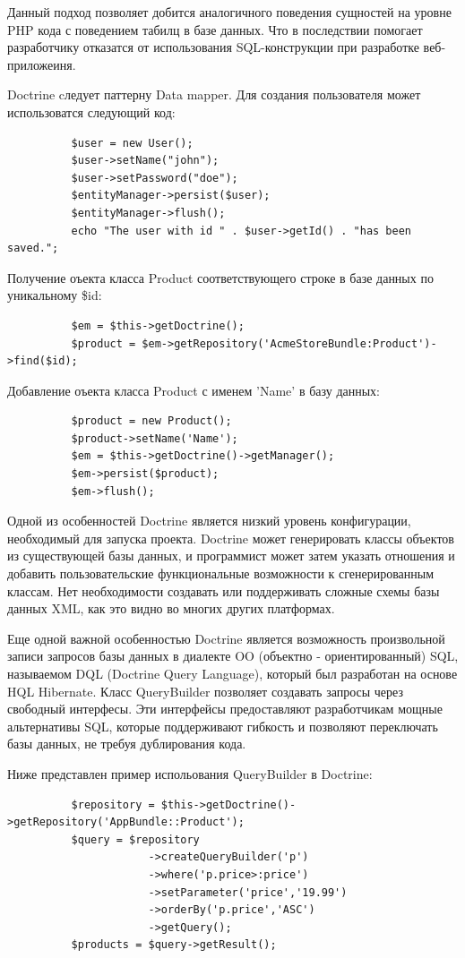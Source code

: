 Данный подход позволяет добится аналогичного поведения сущностей на уровне PHP кода с поведением табилц в базе данных. Что в последствии помогает разработчику отказатся от использования SQL-конструкции при разработке веб-приложеиня. 

Doctrine cледует паттерну Data mapper. Для создания пользователя может использоватся следующий код:

\begin{lstlisting}
          $user = new User();
          $user->setName("john");
          $user->setPassword("doe");
          $entityManager->persist($user);
          $entityManager->flush();
          echo "The user with id " . $user->getId() . "has been saved.";
\end{lstlisting}


Получение оъекта класса Product соответствующего строке в базе данных по уникальному \$id:
\begin{lstlisting}
          $em = $this->getDoctrine();
          $product = $em->getRepository('AcmeStoreBundle:Product')->find($id);
\end{lstlisting}

Добавление оъекта класса Product с именем 'Name' в базу данных:
\begin{lstlisting}
          $product = new Product();
          $product->setName('Name');
          $em = $this->getDoctrine()->getManager();
          $em->persist($product);
          $em->flush();
\end{lstlisting}

Одной из особенностей Doctrine является низкий уровень конфигурации, необходимый для запуска проекта. Doctrine может генерировать классы объектов из существующей базы данных, и программист может затем указать отношения и добавить пользовательские функциональные возможности к сгенерированным классам. Нет необходимости создавать или поддерживать сложные схемы базы данных XML, как это видно во многих других платформах.

Еще одной важной особенностью Doctrine является возможность произвольной записи запросов базы данных в диалекте OO (объектно - ориентированный) SQL, называемом DQL (Doctrine Query Language), который был разработан на основе  HQL Hibernate. Класс QueryBuilder позволяет создавать запросы через свободный интерфесы. Эти интерфейсы предоставляют разработчикам мощные альтернативы SQL, которые поддерживают гибкость и позволяют переключать базы данных, не требуя дублирования кода.

Ниже представлен пример испольования QueryBuilder в Doctrine:
\begin{lstlisting}
          $repository = $this->getDoctrine()->getRepository('AppBundle::Product');
          $query = $repository
                      ->createQueryBuilder('p')
                      ->where('p.price>:price')
                      ->setParameter('price','19.99')
                      ->orderBy('p.price','ASC')
                      ->getQuery();
          $products = $query->getResult();
\end{lstlisting}

